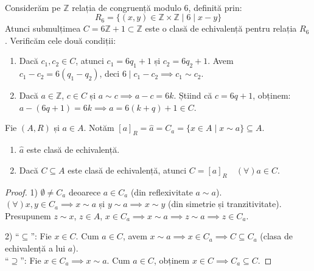 \begin{example}\mbox{}\\
Considerăm pe $\mathbb{Z}$ relația de congruență modulo 6, definită prin:
$$ R_6 = \{(x, y) \in \mathbb{Z} \times \mathbb{Z} \mid 6 \mid x - y\} $$
Atunci submulțimea $C = 6\mathbb{Z} + 1 \subset \mathbb{Z}$ este o clasă de echivalență pentru relația $R_6$. Verificăm cele două condiții:
\begin{enumerate}
    \item Dacă $c_1, c_2 \in C$, atunci $c_1 = 6q_1 + 1$ și $c_2 = 6q_2 + 1$. Avem $c_1 - c_2 = 6(q_1 - q_2)$, deci $6 \mid c_1 - c_2 \implies c_1 \sim c_2$.
    \item Dacă $a \in \mathbb{Z}$, $c \in C$ și $a \sim c \implies a - c = 6k$. Știind că $c = 6q + 1$, obținem: \\
    $a - (6q + 1) = 6k \implies a = 6(k + q) + 1 \in C$.
\end{enumerate}
\end{example}



\vspace{1em}
Fie $(A, R)$ și $a \in A$. Notăm $[a]_R = \hat{a} = C_a = \{x \in A \mid x \sim a\} \subseteq A$.

\begin{proposition}
\begin{enumerate}
    \item $\hat{a}$ este clasă de echivalență.
    \item Dacă $C \subseteq A$ este clasă de echivalență, atunci $C = [a]_R \quad (\forall) a \in C$.
\end{enumerate}
\end{proposition}

\begin{proof}
1) $\emptyset \neq C_a$ deoarece $a \in C_a$ (din reflexivitate $a \sim a$). \\
$(\forall) x, y \in C_a \implies x \sim a$ și $y \sim a \implies x \sim y$ (din simetrie și tranzitivitate). \\
Presupunem $z \sim x$, $z \in A$, $x \in C_a \implies x \sim a \implies z \sim a \implies z \in C_a$.

2) ``$\subseteq$'': Fie $x \in C$. Cum $a \in C$, avem $x \sim a \implies x \in C_a \implies C \subseteq C_a$ (clasa de echivalență a lui $a$). \\
``$\supseteq$'': Fie $x \in C_a \implies x \sim a$. Cum $a \in C$, obținem $x \in C \implies C_a \subseteq C$.
\end{proof}

